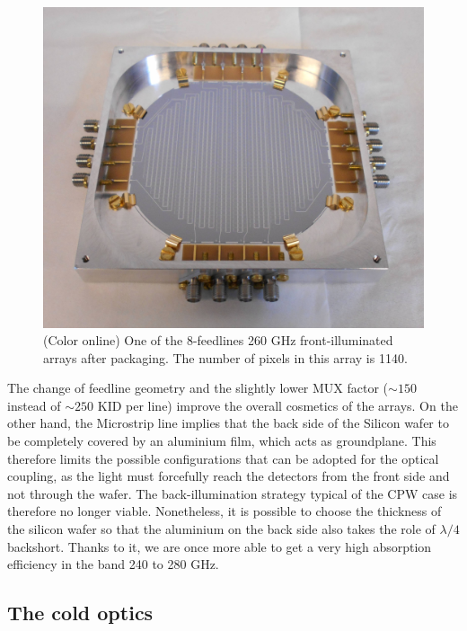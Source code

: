 \documentclass[]{aa} %
\begin{document}
\begin{figure}[h]
   \centering
    \includegraphics[width=.95\linewidth]{1mm_array.jpg}
      \caption{(Color online) One of the 8-feedlines 260 GHz front-illuminated arrays after packaging. The number of pixels in this array is 1140.}
         \label{Array}
\end{figure}

The change of feedline geometry and the slightly lower MUX factor ($\sim150$ instead of $\sim250$ KID per line) improve the overall cosmetics of the arrays. On the other hand, the Microstrip line implies that the back side of the Silicon wafer to be completely covered by an aluminium film, which acts as groundplane. This therefore limits the possible configurations that can be adopted for the optical coupling, as the light must forcefully reach the detectors from the front side and not through the wafer. The back-illumination strategy typical of the CPW case is therefore no longer viable. Nonetheless, it is possible to choose the thickness of the silicon wafer so that the aluminium on the back side also takes the role of $\lambda/4$ backshort. Thanks to it, we are once more able to get a very high absorption efficiency in the band 240 to 280 GHz. 


 \subsection{The cold optics}
\end{document}
